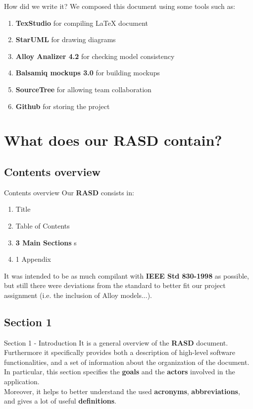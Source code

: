 \documentclass{../common/latex_classes/pdf_presentation}
\begin{document}
	\begin{frame}{How did we write it?}
		We composed this document using some tools such as:
		\begin{enumerate}
			\item\textbf{TexStudio} for compiling \LaTeX{} document
			\item\textbf{StarUML} for drawing diagrams
			\item\textbf{Alloy Analizer 4.2} for checking model consistency
			\item\textbf{Balsamiq mockups 3.0} for building mockups
			\item\textbf{SourceTree} for allowing team collaboration
			\item\textbf{Github} for storing the project 
		\end{enumerate}		
	\end{frame}
	
	\section{What does our RASD contain?}
	
	\subsection{Contents overview}
	
	\begin{frame}{Contents overview}
		Our \textbf{RASD} consists in:
		\begin{enumerate}
			\item Title
			\item Table of Contents
			\item \textbf{3 Main Sections}
		s	\item 1 Appendix
		\end{enumerate}
		It was intended to be as much compilant with \textbf{IEEE Std 830-1998} as possible, but still there were deviations from the standard to better fit our project assignment (i.e. the inclusion of Alloy models...).
	\end{frame}
	
	\subsection{Section 1}
	
	\begin{frame}{Section 1 - Introduction}
		It is a general overview of the \textbf{RASD} document.\\
		Furthermore it specifically provides both a description of high-level software functionalities, and a set of information about the organization of the document.\\
		In particular, this section specifies the \textbf{goals} and the \textbf{actors} involved in the application.\\ 
		Moreover, it helps to better understand the used \textbf{acronyms}, \textbf{abbreviations}, and gives a lot of useful \textbf{definitions}.
	\end{frame}
	
\end{document}
